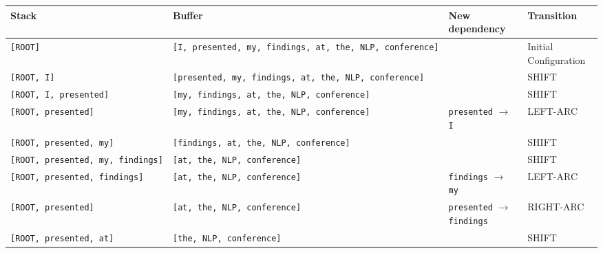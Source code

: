 \documentclass[a4paper,10pt]{article}
\begin{document}
{\footnotesize\setlength{\tabcolsep}{3pt} %
\begin{longtable}[]{@{}
  >{\raggedright\arraybackslash}p{}
  >{\raggedright\arraybackslash}p{}
  >{\raggedright\arraybackslash}p{}
  >{\raggedright\arraybackslash}p{}@{}}
\toprule\noalign{}
\begin{minipage}[b]{\linewidth}\raggedright
Stack
\end{minipage} & \begin{minipage}[b]{\linewidth}\raggedright
Buffer
\end{minipage} & \begin{minipage}[b]{\linewidth}\raggedright
New dependency
\end{minipage} & \begin{minipage}[b]{\linewidth}\raggedright
Transition
\end{minipage} \\
\midrule\noalign{}
\endhead
\bottomrule\noalign{}
\endlastfoot
\texttt{{[}ROOT{]}} & \texttt{{[}I,\ presented,\ my,\ findings,\ at,\ the,\ NLP,\ conference{]}} & & Initial Configuration \\
\texttt{{[}ROOT,\ I{]}} & \texttt{{[}presented,\ my,\ findings,\ at,\ the,\ NLP,\ conference{]}} & & SHIFT \\
\texttt{{[}ROOT,\ I,\ presented{]}} & \texttt{{[}my,\ findings,\ at,\ the,\ NLP,\ conference{]}} & & SHIFT \\
\texttt{{[}ROOT,\ presented{]}} & \texttt{{[}my,\ findings,\ at,\ the,\ NLP,\ conference{]}} & \texttt{presented} $\rightarrow$ \texttt{I} & LEFT-ARC \\
\texttt{{[}ROOT,\ presented,\ my{]}} & \texttt{{[}findings,\ at,\ the,\ NLP,\ conference{]}} & & SHIFT \\
\texttt{{[}ROOT,\ presented,\ my,\ findings{]}} & \texttt{{[}at,\ the,\ NLP,\ conference{]}} & & SHIFT \\
\texttt{{[}ROOT,\ presented,\ findings{]}} & \texttt{{[}at,\ the,\ NLP,\ conference{]}} & \texttt{findings} $\rightarrow$ \texttt{my} & LEFT-ARC \\
\texttt{{[}ROOT,\ presented{]}} & \texttt{{[}at,\ the,\ NLP,\ conference{]}} & \texttt{presented} $\rightarrow$ \texttt{findings} & RIGHT-ARC \\
\texttt{{[}ROOT,\ presented,\ at{]}} & \texttt{{[}the,\ NLP,\ conference{]}} & & SHIFT \\

\end{longtable}}
\end{document}
